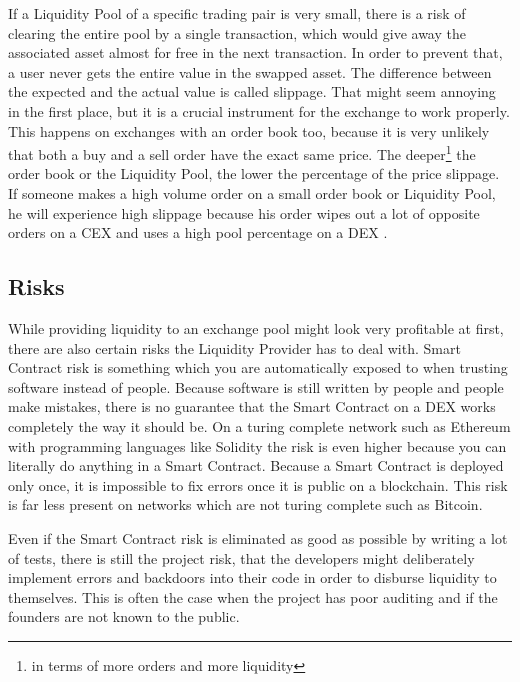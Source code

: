 If a Liquidity Pool of a specific trading pair is very small, there is a risk of clearing the entire pool by a single transaction, which would give away the associated asset almost for free in the next transaction. In order to prevent that, a user never gets the entire value in the swapped asset. The difference between the expected and the actual value is called slippage. That might seem annoying in the first place, but it is a crucial instrument for the exchange to work properly. This happens on exchanges with an order book too, because it is very unlikely that both a buy and a sell order have the exact same price. The deeper\footnote{in terms of more orders and more liquidity} the order book or the Liquidity Pool, the lower the percentage of the price slippage. If someone makes a high volume order on a small order book or Liquidity Pool, he will experience high slippage because his order wipes out a lot of opposite orders on a CEX and uses a high pool percentage on a DEX \cite{Hosp2020}.

\subsection{Risks}
While providing liquidity to an exchange pool might look very profitable at first, there are also certain risks the Liquidity Provider has to deal with. Smart Contract risk is something which you are automatically exposed to when trusting software instead of people. Because software is still written by people and people make mistakes, there is no guarantee that the Smart Contract on a DEX works completely the way it should be. On a turing complete network such as Ethereum with programming languages like Solidity the risk is even higher because you can literally do anything in a Smart Contract. Because a Smart Contract is deployed only once, it is impossible to fix errors once it is public on a blockchain. This risk is far less present on networks which are not turing complete such as Bitcoin.

Even if the Smart Contract risk is eliminated as good as possible by writing a lot of tests, there is still the project risk, that the developers might deliberately implement errors and backdoors into their code in order to disburse liquidity to themselves. This is often the case when the project has poor auditing and if the founders are not known to the public.

